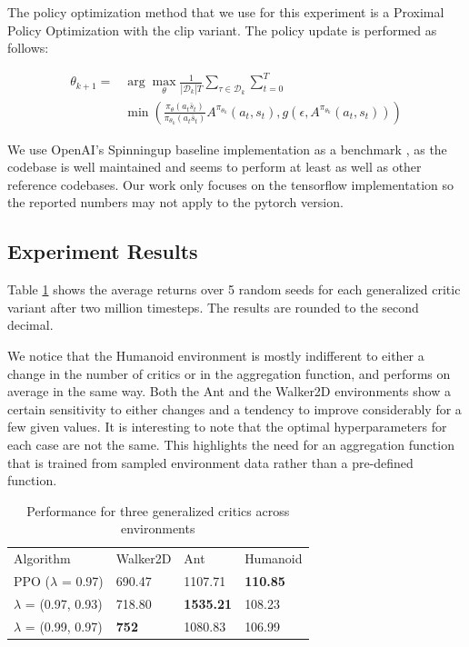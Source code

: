 The policy optimization method that we use for this experiment is a Proximal Policy Optimization\cite{schulman2017proximal} with the clip variant. The policy update is performed as follows:

\begin{align*}
\theta_{k+1} = & \arg \max_{\theta} \frac{1}{| \mathcal{D}_k | T} \sum_{\tau \in \mathcal{D}_k} \sum_{t=0}^T \\ 
& \min \left(\frac{\pi_{\theta}(a_t\bar s_t)}{\pi_{\theta_k}(a_t\bar s_t)} A^{\pi_{\theta_k}}(a_t, s_t), g(\epsilon, A^{\pi_{\theta_k}}(a_t, s_t))\right)
\end{align*}

We use OpenAI's Spinningup baseline implementation as a benchmark \cite{achiam2018openai}, as the codebase is well maintained and seems to perform at least as well as other reference codebases. Our work only focuses on the tensorflow implementation so the reported numbers may not apply to the pytorch version.
\subsection{Experiment Results}

Table \ref{tab:reslam} shows the average returns over 5 random seeds for each generalized critic variant after two million timesteps. The results are rounded to the second decimal.

We notice that the Humanoid environment is mostly indifferent to either a change in the number of critics or in the aggregation function, and performs on average in the same way. Both the Ant and the Walker2D environments show a certain sensitivity to either changes and a tendency to improve considerably for a few given values. It is interesting to note that the optimal hyperparameters for each case are not the same. This highlights the need for an aggregation function that is trained from sampled environment data rather than a pre-defined function.

\begin{table}[!htb]
\begin{tabular}{p{22mm}p{14mm}p{15mm}p{11mm}}
Algorithm & Walker2D & Ant & Humanoid \\
PPO ($\lambda$ = 0.97) & 690.47 & 1107.71 & \textbf{110.85} \\
\hline
$\lambda$ = (0.97, 0.93) & 718.80 & \textbf{1535.21} & 108.23  \\ 
\hline
$\lambda$ = (0.99, 0.97)& \textbf{752} & 1080.83 & 106.99 \\ 
\end{tabular}
\caption{Performance for three generalized critics across environments}
\label{tab:reslam}
\end{table}


